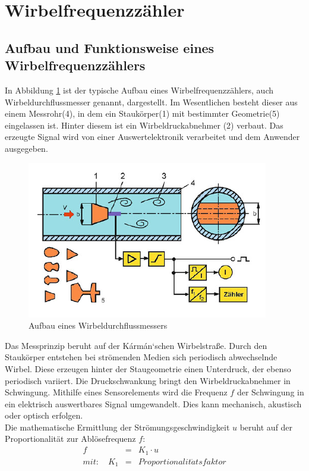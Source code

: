 \section{Wirbelfrequenzzähler}
\subsection{Aufbau und Funktionsweise eines Wirbelfrequenzzählers}
In Abbildung \ref{fig:wirbelzaehler} ist der typische Aufbau eines Wirbelfrequenzzählers, auch Wirbeldurchflussmesser genannt, dargestellt. Im Wesentlichen besteht dieser aus einem Messrohr(4), in dem ein Staukörper(1) mit bestimmter Geometrie(5) eingelassen ist. Hinter diesem ist ein Wirbeldruckabnehmer (2) verbaut. Das erzeugte Signal wird von einer Auswertelektronik verarbeitet und dem Anwender ausgegeben.\autocite[vgl.][803\psqq]{Sensortechnik}
\begin{figure}[H]
   \centering
    \includegraphics[scale=0.75]{Bilder/Wirbelzaehler.png}
    \caption[Aufbau eines Wirbeldurchflussmessers]{Aufbau eines Wirbeldurchflussmessers\footnotemark}
    \label{fig:wirbelzaehler}
\end{figure}
Das Messprinzip beruht auf der K\'{a}rm\'{a}n`schen Wirbelstraße. Durch den Staukörper entstehen bei strömenden Medien sich periodisch abwechselnde Wirbel. Diese erzeugen hinter der Staugeometrie einen Unterdruck, der ebenso periodisch variiert. Die Druckschwankung bringt den Wirbeldruckabnehmer in Schwingung. Mithilfe eines Sensorelements wird die Frequenz $f$ der Schwingung in ein elektrisch auswertbares Signal umgewandelt. Dies kann mechanisch, akustisch oder optisch erfolgen.\autocite[vgl.][S. 803]{Sensortechnik}\\
Die mathematische Ermittlung der Strömungsgeschwindigkeit $u$ beruht auf der Proportionalität zur Ablösefrequenz $f$: 
\begin{eqnarray}\label{for:f}
    f &=& K_1 \cdot u \\
    mit: \quad K_1 &=& Proportionalit\ddot{a}tsfaktor \nonumber
\end{eqnarray}
